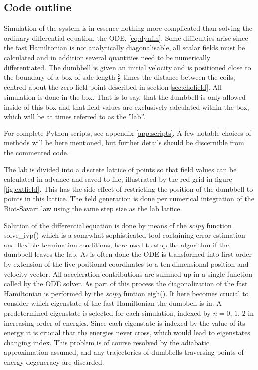 \documentclass[main.tex]{subfiles}
\begin{document}
\subsection{Code outline}\label{sec:code}
Simulation of the system is in essence nothing more complicated than solving the
ordinary differential equation, the ODE, \ref{eq:dynfin}. Some difficulties arise since the fast
Hamiltonian is not analytically diagonalisable, all scalar fields must be calculated and in
addition several quantities need to be numerically differentiated. The dumbbell is given an
initial velocity and is positioned close to the boundary of a box of side length \(\frac{3}{5}\) times the
distance between the coils, centred about the zero-field point described in section
\ref{sec:chofield}. All simulation is done in the box. That is to say, that the dumbbell is
only allowed inside of this box and that field values are exclusively calculated within the
box, which will be at times referred to as the ''lab''.

For complete Python scripts, see appendix \ref{app:scripts}. A few notable choices of
methods will be here mentioned, but further details should be discernible from the
commented code.

The lab is divided into a discrete lattice of points so that field values can be
calculated in advance and saved to file, illustrated by the red grid in figure
\ref{fig:extfield}. This has the side-effect of restricting the
position of the dumbbell to points in this lattice. The field generation is done per numerical
integration of the Biot-Savart law using the same step size as the lab lattice.

Solution of the differential equation is done by means of the \textit{scipy} function
solve\_ivp() which is a somewhat sophisticated tool containing error estimation and
flexible termination conditions, here used to stop the algorithm if the dumbbell leaves the
lab. As is often done the ODE is transformed into first order by extension of the
five positional coordinates to a ten-dimensional position and velocity vector. All
acceleration contributions are summed up in a single function called by the ODE solver. 
As part of this process the diagonalization of the fast Hamiltonian is performed by the
\textit{scipy} funtion eigh(). It here becomes crucial to consider which eigenstate of the
fast Hamiltonian the dumbbell is in. A predetermined eigenstate is selected for each
simulation, indexed by \(n = 0\), \(1\), \(2\) in increasing order of energies. Since each
eigenstate is indexed by the value of its energy it is crucial that the energies never
cross, which would lead to eigenstates changing index. This problem is of course resolved
by the adiabatic approximation assumed, and any trajectories of dumbbells traversing points
of energy degeneracy are discarded.
\end{document}

